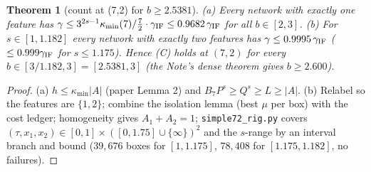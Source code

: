 \documentclass[11pt]{article}
\newtheorem{theorem}{Theorem}\newtheorem{lemma}[theorem]{Lemma}\newtheorem{corollary}[theorem]{Corollary}
\begin{document}
\begin{theorem}[count at (7,2) for $b\ge2.5381$]
(a) Every network with exactly one feature has $\gamma\le3^{2s-1}\kappa_{\min}(7)/\tfrac72\cdot\gamma_{\rm IF}\le0.9682\,\gamma_{\rm IF}$ for all $b\in[2,3]$.
(b) For $s\in[1,1.182]$ every network with exactly two features has $\gamma\le0.9995\,\gamma_{\rm IF}$ ($\le0.999\gamma_{\rm IF}$ for $s\le1.175$).
Hence (C) holds at $(7,2)$ for every $b\in[3/1.182,3]=[2.5381,3]$ (the Note's dense theorem gives $b\ge2.600$).
\end{theorem}
\begin{proof}
(a) $h\le\kappa_{\min}|A|$ (paper Lemma 2) and $B_7P^s\ge Q^s\ge L\ge|A|$.  (b) Relabel so the features are $\{1,2\}$; combine the isolation lemma (best $\mu$ per box)
with the cost ledger; homogeneity gives $A_1+A_2=1$; \texttt{simple72\_rig.py} covers $(\tau,x_1,x_2)\in[0,1]\times([0,1.75]\cup\{\infty\})^2$ and the $s$-range by an interval
branch and bound ($39{,}676$ boxes for $[1,1.175]$, $78{,}408$ for $[1.175,1.182]$, no failures).
\end{proof}
\end{document}
